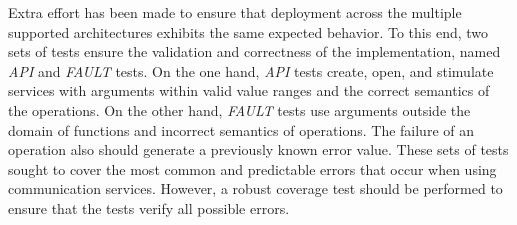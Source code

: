 			Extra effort has been made to ensure that deployment across the
			multiple supported architectures exhibits the same expected behavior.
			To this end, two sets of tests ensure the validation and correctness
			of the implementation, named \textit{API} and \textit{FAULT} tests.
			On the one hand, \textit{API} tests create, open, and stimulate
			services with arguments within valid value ranges and the correct
			semantics of the operations. On the other hand, \textit{FAULT} tests
			use arguments outside the domain of functions and incorrect semantics
			of operations. The failure of an operation also should generate a
			previously known error value. These sets of tests sought to cover the
			most common and predictable errors that occur when using communication
			services. However, a robust coverage test should be performed to ensure
			that the tests verify all possible errors.

